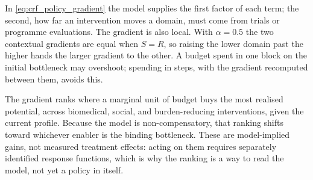 In \eqref{eq:crf_policy_gradient} the model supplies the first factor of each
term; the second, how far an intervention moves a domain, must come from trials
or programme evaluations. The gradient is also local. With $\alpha=0.5$ the two
contextual gradients are equal when $S=R$, so raising the lower domain past the
higher hands the larger gradient to the other. A budget spent in one block on
the initial bottleneck may overshoot; spending in steps, with the gradient
recomputed between them, avoids this.

\begin{reading}
The gradient ranks where a marginal unit of budget buys the most realised potential,
across biomedical, social, and burden-reducing interventions, given the current
profile. Because the model is non-compensatory, that ranking shifts toward whichever
enabler is the binding bottleneck. These are model-implied gains, not measured
treatment effects: acting on them requires separately identified response functions,
which is why the ranking is a way to read the model, not yet a policy in itself.
\end{reading}

